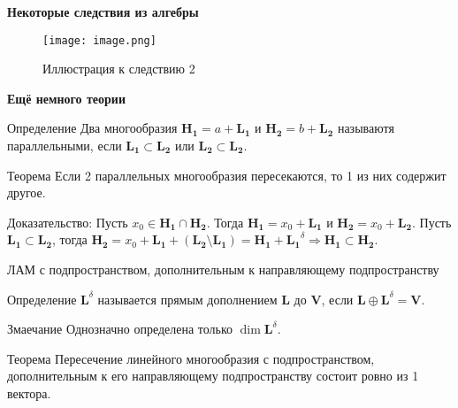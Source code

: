 \documentclass{beamer}
\begin{document}
\begin{frame}{\textbf{Некоторые следствия из алгебры}}
\begin{figure}[h]

\centering

\texttt{[image: image.png]}


Иллюстрация к следствию 2
\label{fig:mpr}

\end{figure}

\end{frame}


\begin{frame}{\textbf{Ещё немного теории}}
\begin{block}{Определение}
    Два многообразия $\mathbf{H_1}=a+\mathbf{L_1}$ и $\mathbf{H_2}=b+\mathbf{L_2}$ называютя параллельными, если $\mathbf{L_1} \subset \mathbf{L_2}$ или $\mathbf{L_2} \subset \mathbf{L_2}$.
\end{block}
\begin{block}{Теорема}
    Если 2 параллельных многообразия пересекаются, то 1 из них содержит другое.
\end{block}
\begin{block}{Доказательство:}
Пусть $x_0\in\mathbf{H_1}\cap\mathbf{H_2}$. Тогда $\mathbf{H_1}=x_0+\mathbf{L_1}$ и $\mathbf{H_2}=x_0+\mathbf{L_2}$. Пусть $\mathbf{L_1} \subset \mathbf{L_2}$, тогда $\mathbf{H_2}=x_0+\mathbf{L_1}+(\mathbf{L_2}\setminus \mathbf{L_1})=\mathbf{H_1}+\mathbf{L_1}^\delta
\Rightarrow \mathbf{H_1} \subset \mathbf{H_2}$.
\end{block}
\end{frame}


\begin{frame}{ ЛАМ с подпространством, дополнительным к направляющему подпространству}

\begin{block}{Определение}
    $\mathbf{L}^\delta$ называется прямым дополнением $\mathbf{L}$ до $\mathbf{V}$, если $\mathbf{L}\oplus \mathbf{L}^\delta=\mathbf{V}$.
\end{block}

\begin{block}{Змаечание}
    Однозначно определена только $\dim\mathbf{L}^\delta$.
\end{block}

\begin{block}{Теорема}
 Пересечение линейного многообразия с подпространством, дополнительным к его направляющему подпространству состоит ровно из 1 вектора.   
\end{block}

\end{frame}
\end{document}
